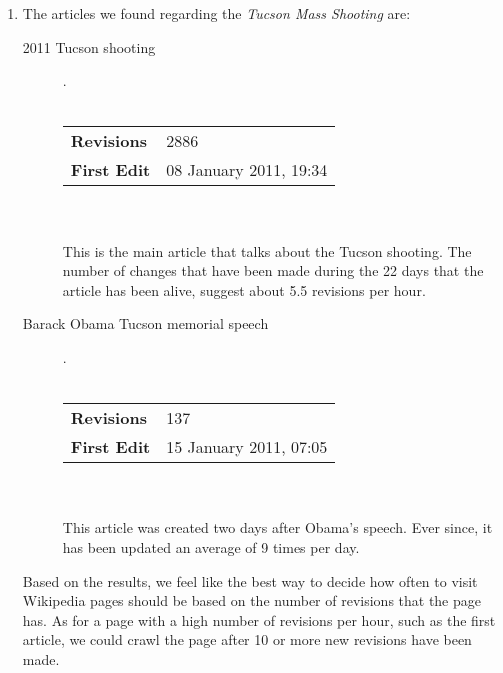 \documentclass[a4paper,11pt,oneside]{book}
\begin{document}
\begin{enumerate}
	\item The articles we found regarding the {\it Tucson Mass Shooting} are:

		\begin{description}
		\item [2011 Tucson shooting] .\\ \\
			\begin{tabular}{| l || l | } \hline
			  {\bf Revisions} & 2886 \\
			  {\bf First Edit} & 08 January 2011, 19:34 \\\hline
			\end{tabular}\\\\
This is the main article that talks about the Tucson shooting. The number of changes that have been made during the 22 days that the article has been alive, suggest about 5.5 revisions per hour.

		\item[Barack Obama Tucson memorial speech].\\\\
			\begin{tabular}{| l || l | } \hline
			  {\bf Revisions} & 137\\
			  {\bf First Edit} & 15 January 2011, 07:05\\	\hline
			\end{tabular} \\\\
	This article was created two days after Obama's speech. Ever since, it has been updated an average of 9 times per day.

		\end{description}

	Based on the results, we feel like the best way to decide how often to visit Wikipedia pages should be based on the number of revisions that the page has.  As for a page with a high number of revisions per hour, such as the first article, we could crawl the page after 10 or more new revisions have been made. 
 \end {enumerate}






\end{document}
